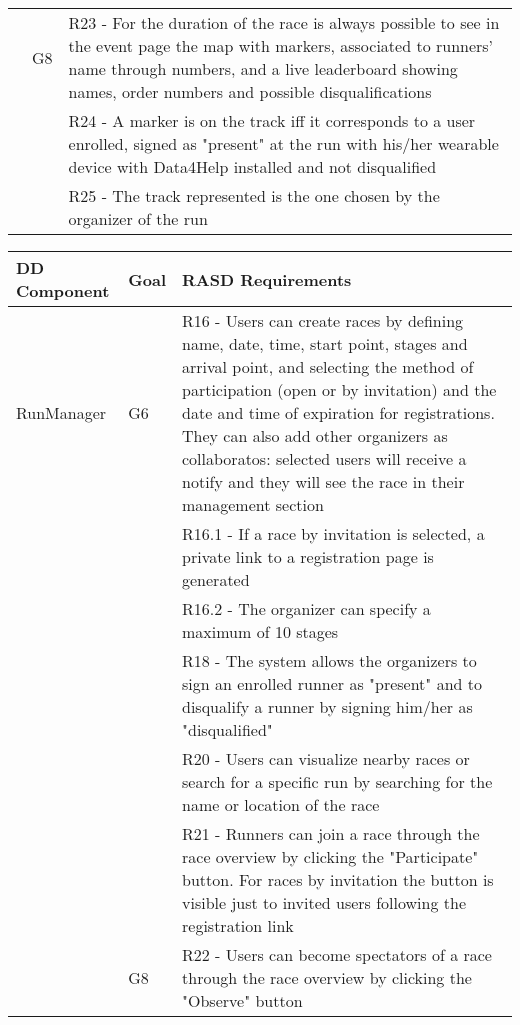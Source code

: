 \begin{table}[]
\begin{adjustbox}{width=\textwidth}
\begin{tabular}{|p{}|p{}|p{}|}
					& G8	 & R23 -	For the duration of the race is always possible to see in the event page the map with markers, associated to runners' name through numbers, and a live leaderboard showing names, order numbers and possible disqualifications \\[10pt]
					&		& R24 -	A marker is on the track iff it corresponds to a user enrolled, signed as "present" at the run with his/her wearable device with Data4Help installed and not disqualified \\[10pt]
					&		& R25 -	The track represented is the one chosen by the organizer of the run \\[10pt] \hline
\end{tabular}
\end{adjustbox}
\end{table}

\begin{table}[]
\begin{adjustbox}{width=\textwidth}
\begin{tabular}{|p{}|p{}|p{}|}
\hline
\textbf{DD Component} & \textbf{Goal} & \textbf{RASD Requirements}\\ \hline
RunManager			& G6	 & R16 -	 Users can create races by defining name, date, time, start point, stages and arrival point, and selecting the method of participation (open or by invitation) and the date and time of expiration for registrations. They can also add other organizers as collaboratos: selected users will receive a notify and they will see the race in their management section \\[10pt]
					&		& R16.1 - If a race by invitation is selected, a private link to a registration page is generated \\[10pt]
					&		& R16.2	- The organizer can specify a maximum of 10 stages \\[10pt]
					&		& R18 -	The system allows the organizers to sign an enrolled runner as "present" and to disqualify a runner by signing him/her as "disqualified" \\[10pt]
					&		& R20 -	Users can visualize nearby races or search for a specific run by searching for the name or location of the race \\[10pt]
					&		& R21 -	Runners can join a race through the race overview by clicking the "Participate" button. For races by invitation the button is visible just to invited users following the registration link \\[10pt]
					& G8	 & R22 -	 Users can become spectators of a race through the race overview by clicking the "Observe" button \\[10pt] \hline
\end{tabular}
\end{adjustbox}
\end{table}

%